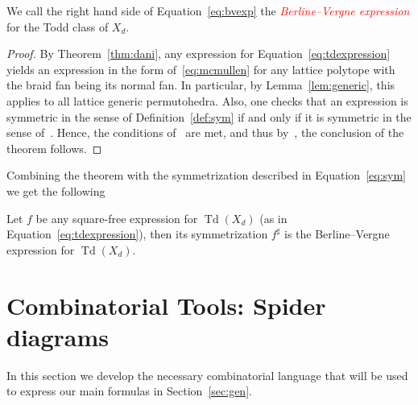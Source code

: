 \documentclass[ALCO,ThmDefs,Unicode,epreuves]{cedram}
\newcommand{\important}[1]{\emph{\textcolor{red}{#1}}}
\DeclareMathOperator{\td}{Td}
\begin{document}
We call the right hand side of Equation~\eqref{eq:bvexp} the \important{Berline--Vergne expression} for the Todd class of $X_d$.

\begin{proof}
	By Theorem~\ref{thm:dani}, any expression for Equation~\eqref{eq:tdexpression} yields an expression in the form of~\eqref{eq:mcmullen} for any lattice polytope with the braid fan being its normal fan. In particular, by Lemma~\ref{lem:generic}, this applies to all lattice generic permutohedra. Also, one checks that an expression is symmetric in the sense of Definition~\ref{def:sym} if and only if it is symmetric in the sense of~\cite[Definition~3.13]{bvalpha}. 
	Hence, the conditions of~\cite[Setup~4.1]{bvalpha} are met, and thus by~\cite[Theorem~5.5]{bvalpha}, the conclusion of the theorem follows. 
\end{proof}


Combining the theorem with the symmetrization described in Equation~\eqref{eq:sym} we get the following

\begin{prop}\label{prop:symm}
	Let $f$ be any square-free expression for $\td(X_d)$ (as in Equation~\eqref{eq:tdexpression}), then its symmetrization $f^{\sharp}$ is the Berline--Vergne expression for $\td(X_d)$.
\end{prop}

\section{Combinatorial Tools: Spider diagrams}\label{sec:spider}


In this section we develop the necessary combinatorial language that will be used to express our main formulas in Section~\ref{sec:gen}.
\end{document}
